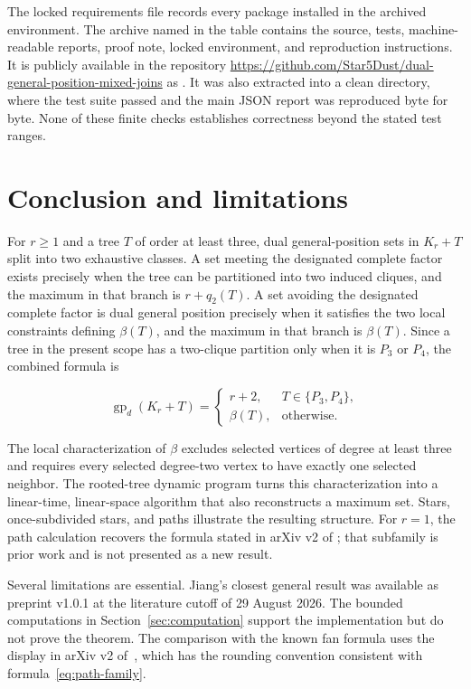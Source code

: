 \documentclass[11pt,a4paper]{article}
\numberwithin{equation}{section}
\begin{document}
The locked requirements file records every package installed in the archived
environment. The archive named in the table contains the source, tests,
machine-readable reports, proof note, locked environment, and reproduction
instructions. It is publicly available in the repository
\url{https://github.com/Star5Dust/dual-general-position-mixed-joins} as
.
It was also extracted into a clean directory, where the test suite passed and
the main JSON report was reproduced byte for byte. None of these finite checks
establishes correctness beyond the stated test ranges.

\section{Conclusion and limitations}\label{sec:conclusion}

For \(r\ge 1\) and a tree \(T\) of order at least three, dual
general-position sets in \(K_r+T\) split into two exhaustive classes. A
set meeting the designated complete factor exists precisely when the tree can be
partitioned into two induced cliques, and the maximum in that branch is
\(r+q_2(T)\). A set avoiding the designated complete factor is dual general
position precisely when it satisfies the two local constraints defining
\(\beta(T)\), and the maximum in that branch is \(\beta(T)\). Since a
tree in the present scope has a two-clique partition only when it is
\(P_3\) or \(P_4\), the combined formula is

\[
\operatorname{gp}_d(K_r+T)=
\begin{cases}
r+2,&T\in\{P_3,P_4\},\\
\beta(T),&\text{otherwise}.
\end{cases}
\]

The local characterization of \(\beta\) excludes selected vertices of
degree at least three and requires every selected degree-two vertex to
have exactly one selected neighbor. The rooted-tree dynamic program
turns this characterization into a linear-time, linear-space algorithm
that also reconstructs a maximum set. Stars, once-subdivided stars, and
paths illustrate the resulting structure. For \(r=1\), the path
calculation recovers the formula stated in arXiv v2 of
\cite{tian-et-al-removal}; that subfamily is prior work and is not presented as
a new result.

Several limitations are essential. Jiang's closest general result
\cite{jiang-complete-first-factor} was available as preprint v1.0.1 at the
literature cutoff of 29 August 2026. The bounded computations in
Section~\ref{sec:computation} support the implementation but do not prove the
theorem. The comparison with the known fan formula uses the display in arXiv
v2 of~\cite{tian-et-al-removal}, which has the rounding convention consistent
with formula~\eqref{eq:path-family}.
\end{document}
